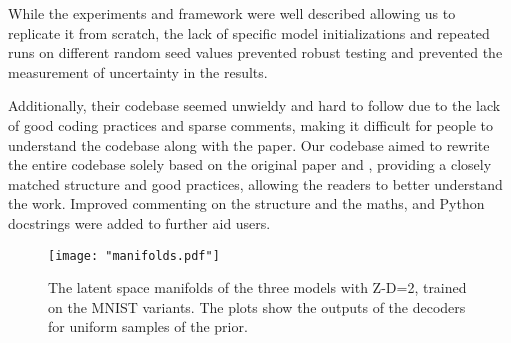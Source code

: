 While the experiments and framework were well described allowing us to replicate it from scratch, the lack of specific model initializations and repeated runs on different random seed values prevented robust testing and prevented the measurement of uncertainty in the results.

Additionally, their codebase seemed unwieldy and hard to follow due to the lack of good coding practices and sparse comments, making it difficult for people to understand the codebase along with the paper. Our codebase aimed to rewrite the entire codebase solely based on the original paper and \cite{kingma2014stochastic}, providing a closely matched structure and good practices, allowing the readers to better understand the work. Improved commenting on the structure and the maths, and Python docstrings were added to further aid users.


\begin{figure}[t]
    \begin{center}
        \texttt{[image: "manifolds.pdf"]}
    \end{center}
    \caption{The latent space manifolds of the three models with Z-D=2, trained on the MNIST variants. The plots show the outputs of the decoders for uniform samples of the prior.}
    \label{fig:manifold}
\end{figure}
